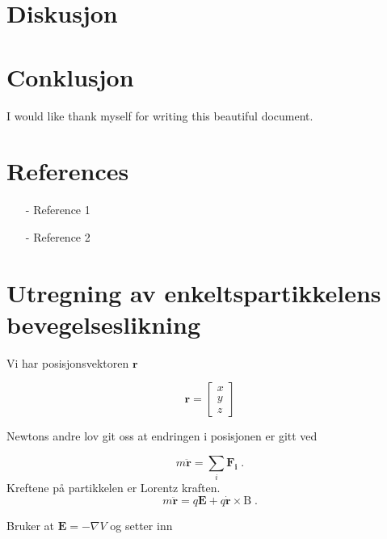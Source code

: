 \documentclass[reprint,english,notitlepage, nofootinbib]{revtex4-1}  %
\begin{document}
\section{Diskusjon}
\section{Conklusjon}
\begin{acknowledgments}  %
I would like thank myself for writing this beautiful document.
\end{acknowledgments}


\section*{References}  %
\begin{itemize}
\item[-]Reference 1
\item[-]Reference 2
\end{itemize}

\newpage
\appendix
\section{Utregning av enkeltspartikkelens bevegelseslikning}
\label{moteq}
Vi har posisjonsvektoren $\mathbf{r}$

$$\mathbf{r} = \begin{bmatrix}
x \\ y \\ z 
\end{bmatrix}$$

Newtons andre lov git oss at endringen i posisjonen er gitt ved

$$m \ddot{\mathbf{r}} = \sum_i \mathbf{F_i} \; .$$
Kreftene på partikkelen er Lorentz kraften.
$$m \ddot{\mathbf{r}} = q \mathbf{E} + q \dot{\mathbf{r}} \times\mathrm{B} \; .$$

Bruker at $\mathbf{E} = -\nabla{V}$ og setter inn
\end{document}
